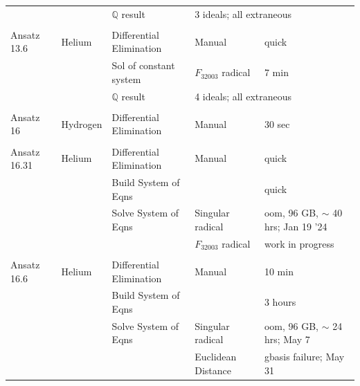 \documentclass{article}
\def\R32003{$F_{32003}$}
\begin{document}
\begin{longtable}{lllll}
           &               &$\mathbb{Q}$ result                 &\multicolumn{2}{l}{3 ideals; all extraneous}\\
           &               &                         &                      &\\
Ansatz 13.6&Helium         &Differential Elimination &Manual                &quick\\
           &               &Sol of constant system   &\R32003 radical             &7 min\\
           &               &$\mathbb{Q}$ result                 &\multicolumn{2}{l}{4 ideals; all extraneous}\\
           &               &                         &                      &\\
Ansatz 16  &Hydrogen       &Differential Elimination &Manual                &30 sec\\
           &               &                         &                      &\\
Ansatz 16.31&Helium        &Differential Elimination &Manual                &quick\\
           &               &Build System of Eqns     &                      &quick\\
           &               &Solve System of Eqns     &Singular radical      &oom, 96 GB, $\sim$ 40 hrs; Jan 19 '24\\
           &               &                         &\R32003 radical       &work in progress\\
           &               &                         &                      &\\
Ansatz 16.6&Helium         &Differential Elimination &Manual                &10 min\\
           &               &Build System of Eqns     &                      &3 hours\\
           &               &Solve System of Eqns     &Singular radical      &oom, 96 GB, $\sim$ 24 hrs; May 7\\
           &               &                         &Euclidean Distance    &gbasis failure; May 31\\
\end{longtable}
\end{document}
